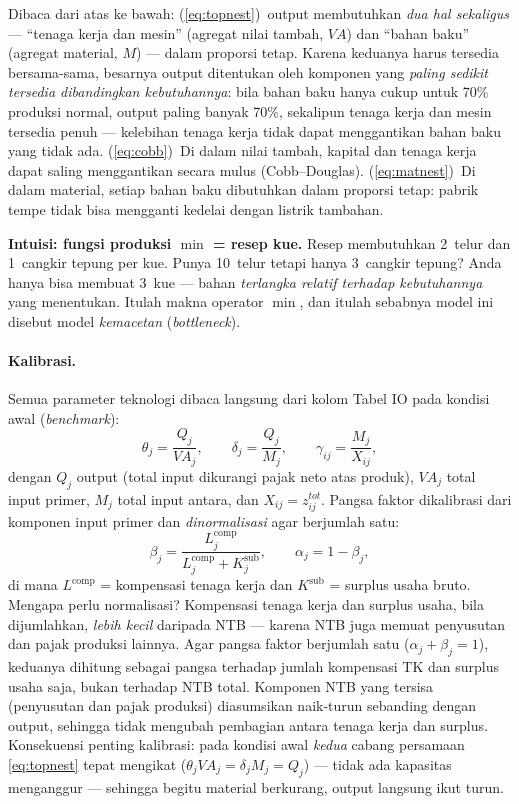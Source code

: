 \documentclass[11pt,a4paper]{article}
\newcommand{\en}[1]{\textit{#1}}   %
\begin{document}
Dibaca dari atas ke bawah: (\ref{eq:topnest})~output membutuhkan
\emph{dua hal sekaligus} --- ``tenaga kerja dan mesin'' (agregat nilai
tambah, $VA$) dan ``bahan baku'' (agregat material, $M$) --- dalam
proporsi tetap. Karena keduanya harus tersedia bersama-sama, besarnya
output ditentukan oleh komponen yang \emph{paling sedikit tersedia
dibandingkan kebutuhannya}: bila bahan baku hanya cukup untuk 70\%
produksi normal, output paling banyak 70\%, sekalipun tenaga kerja dan
mesin tersedia penuh --- kelebihan tenaga kerja tidak dapat menggantikan
bahan baku yang tidak ada. (\ref{eq:cobb})~Di dalam nilai tambah, kapital
dan tenaga kerja dapat saling menggantikan secara mulus (Cobb--Douglas).
(\ref{eq:matnest})~Di dalam material, setiap bahan baku dibutuhkan dalam
proporsi tetap: pabrik tempe tidak bisa mengganti kedelai dengan listrik
tambahan.

\begin{intuisi}
\textbf{Intuisi: fungsi produksi $\min$ = resep kue.} Resep membutuhkan
2~telur dan 1~cangkir tepung per kue. Punya 10~telur tetapi hanya 3~cangkir
tepung? Anda hanya bisa membuat 3~kue --- bahan \emph{terlangka relatif
terhadap kebutuhannya} yang menentukan. Itulah makna operator $\min$, dan
itulah sebabnya model ini disebut model \emph{kemacetan}
(\en{bottleneck}).
\end{intuisi}

\paragraph{Kalibrasi.} Semua parameter teknologi dibaca langsung dari kolom
Tabel IO pada kondisi awal (\en{benchmark}):
\begin{equation}
\theta_j = \frac{Q_j}{VA_j}, \qquad
\delta_j = \frac{Q_j}{M_j}, \qquad
\gamma_{ij} = \frac{M_j}{X_{ij}},
\end{equation}
dengan $Q_j$ output (total input dikurangi pajak neto atas produk),
$VA_j$ total input primer, $M_j$ total input antara, dan
$X_{ij} = z^{tot}_{ij}$. Pangsa faktor dikalibrasi dari komponen input
primer dan \emph{dinormalisasi} agar berjumlah satu:
\begin{equation}
\beta_j = \frac{L_j^{\text{comp}}}{L_j^{\text{comp}} + K_j^{\text{sub}}},
\qquad \alpha_j = 1 - \beta_j,
\label{eq:shares}
\end{equation}
di mana $L^{\text{comp}}$ = kompensasi tenaga kerja dan $K^{\text{sub}}$ =
surplus usaha bruto. Mengapa perlu normalisasi? Kompensasi tenaga kerja
dan surplus usaha, bila dijumlahkan, \emph{lebih kecil} daripada NTB ---
karena NTB juga memuat penyusutan dan pajak produksi lainnya. Agar pangsa
faktor berjumlah satu ($\alpha_j + \beta_j = 1$), keduanya dihitung
sebagai pangsa terhadap jumlah kompensasi TK dan surplus usaha saja,
bukan terhadap NTB total. Komponen NTB yang tersisa (penyusutan dan pajak
produksi) diasumsikan naik-turun sebanding dengan output, sehingga tidak
mengubah pembagian antara tenaga kerja dan surplus. Konsekuensi penting
kalibrasi: pada kondisi awal \emph{kedua} cabang persamaan
\eqref{eq:topnest} tepat mengikat ($\theta_j VA_j = \delta_j M_j = Q_j$)
--- tidak ada kapasitas menganggur --- sehingga begitu material berkurang,
output langsung ikut turun.
\end{document}
